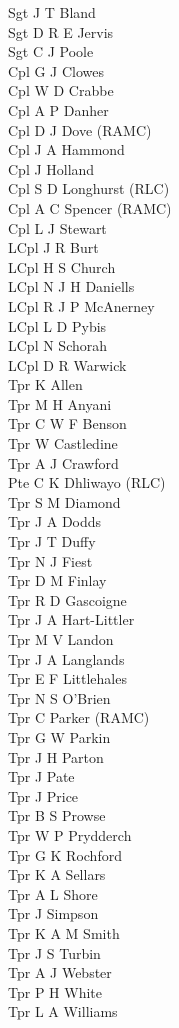 \begin{multicols}{3}
  \footnotesize
  \noindent
  Sgt J T Bland \\
  Sgt D R E Jervis \\
  Sgt C J Poole \\
  Cpl G J Clowes \\
  Cpl W D Crabbe \\
  Cpl A P Danher \\
  Cpl D J Dove (RAMC) \\
  Cpl J A Hammond \\
  Cpl J Holland \\
  Cpl S D Longhurst (RLC) \\
  Cpl A C Spencer (RAMC) \\
  Cpl L J Stewart \\
  LCpl J R Burt \\
  LCpl H S Church \\
  LCpl N J H Daniells \\
  LCpl R J P McAnerney \\
  LCpl L D Pybis \\
  LCpl N Schorah \\
  LCpl D R Warwick \\
  Tpr K Allen \\
  Tpr M H Anyani \\
  Tpr C W F Benson \\
  Tpr W Castledine \\
  Tpr A J Crawford \\
  Pte C K Dhliwayo (RLC) \\
  Tpr S M Diamond \\
  Tpr J A Dodds \\
  Tpr J T Duffy \\
  Tpr N J Fiest \\
  Tpr D M Finlay \\
  Tpr R D Gascoigne \\
  Tpr J A Hart-Littler \\
  Tpr M V Landon \\
  Tpr J A Langlands \\
  Tpr E F Littlehales \\
  Tpr N S O'Brien \\
  Tpr C Parker (RAMC) \\
  Tpr G W Parkin \\
  Tpr J H Parton \\
  Tpr J Pate \\
  Tpr J Price \\
  Tpr B S Prowse \\
  Tpr W P Prydderch \\
  Tpr G K Rochford \\
  Tpr K A Sellars \\
  Tpr A L Shore \\
  Tpr J Simpson \\
  Tpr K A M Smith \\
  Tpr J S Turbin \\
  Tpr A J Webster \\
  Tpr P H White \\
  Tpr L A Williams \\
\end{multicols}


